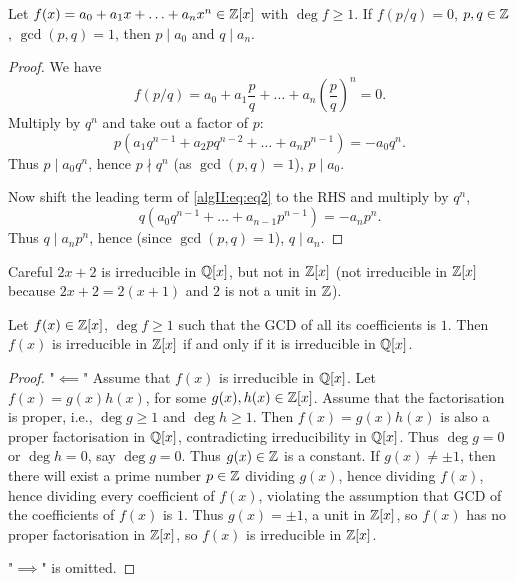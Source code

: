 \documentclass[10pt, a4paper]{article}
\begin{document}
\begin{proposition}
    Let $f(x) = a_0 + a_1x + \dotsc + a_nx ^ n \in \mathbb{Z}[x]$ with $\deg{f} \geq 1$.
    If $f(p / q) = 0$,
    $p, q \in \mathbb{Z}$,
    $\gcd(p, q) = 1$,
    then $p \mid a_0$ and $q \mid a_n$.

    \begin{proof}
        We have
        \begin{equation}\label{algII:eq:eq2}\tag{*}
            f(p / q) = a_0 + a_1\frac{p}{q} + \dotsc + a_n\left(\frac{p}{q}\right) ^ n = 0.
        \end{equation}
        Multiply by $q ^ n$ and take out a factor of $p$:
        \[
        p(a_1q ^ {n - 1} + a_2pq ^ {n - 2} + \dotsc + a_np ^ {n - 1}) = -a_0q ^ n.
        \]
        Thus $p \mid a_0q ^ n$,
        hence $p\nmid q ^ n$
        (as $\gcd(p, q) = 1$),
        $p \mid a_0$.

        Now shift the leading term of \eqref{algII:eq:eq2} to the RHS and multiply by $q ^ n$,
        \[
        q(a_0q ^ {n - 1} + \dotsc + a_{n - 1}p ^ {n - 1}) = -a_np ^ n.
        \]
        Thus $q \mid a_np ^ n$,
        hence
        (since $\gcd(p, q) = 1$),
        $q \mid a_n$.
    \end{proof}
\end{proposition}
Careful $2x + 2$ is irreducible in $\mathbb{Q}[x]$,
but not in $\mathbb{Z}[x]$
(not irreducible in $\mathbb{Z}[x]$ because $2x + 2 = 2(x + 1)$ and $2$ is not a unit in $\mathbb{Z}$).

\begin{theorem}
    Let $f(x) \in \mathbb{Z}[x]$,
    $\deg{f} \geq 1$ such that the GCD of all its coefficients is $1$.
    Then $f(x)$ is irreducible in $\mathbb{Z}[x]$ if and only if it is irreducible in $\mathbb{Q}[x]$.

    \begin{proof}
        "$\impliedby$"
        Assume that $f(x)$ is irreducible in $\mathbb{Q}[x]$.
        Let $f(x) = g(x)h(x)$,
        for some $g(x), h(x) \in \mathbb{Z}[x]$.
        Assume that the factorisation is proper,
        i.e.,
        $\deg{g} \geq 1$ and $\deg{h} \geq 1$.
        Then $f(x) = g(x)h(x)$ is also a proper factorisation in $\mathbb{Q}[x]$,
        contradicting irreducibility in $\mathbb{Q}[x]$.
        Thus $\deg{g} = 0$ or $\deg{h} = 0$,
        say $\deg{g} = 0$.
        Thus $g(x) \in \mathbb{Z}$ is a constant.
        If $g(x) \neq \pm 1$,
        then there will exist a prime number $p \in \mathbb{Z}$ dividing $g(x)$,
        hence dividing $f(x)$,
        hence dividing every coefficient of $f(x)$,
        violating the assumption that GCD of the coefficients of $f(x)$ is $1$.
        Thus $g(x) = \pm 1$,
        a unit in $\mathbb{Z}[x]$,
        so $f(x)$ has no proper factorisation in $\mathbb{Z}[x]$,
        so $f(x)$ is irreducible in $\mathbb{Z}[x]$.

        "$\implies$" is omitted.
    \end{proof}
\end{theorem}
\end{document}
